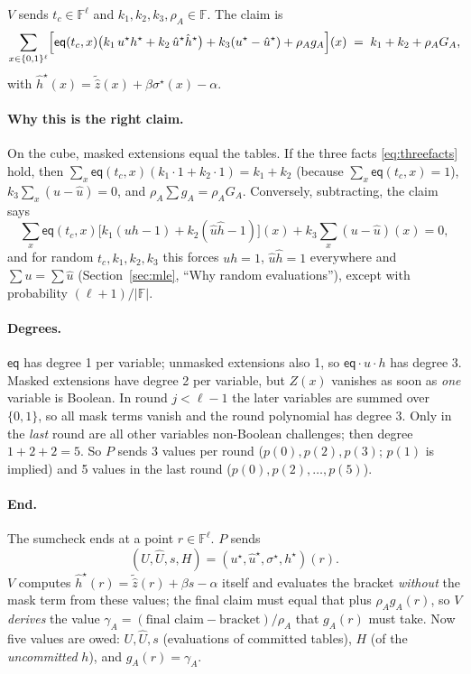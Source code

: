 \documentclass[11pt,a4paper]{article}
\newcommand{\F}{\mathbb{F}}
\newcommand{\cube}[1]{\{0,1\}^{#1}}
\newcommand{\eq}{\mathsf{eq}}
\newcommand{\mle}[1]{\widetilde{#1}}
\newcommand{\msk}[1]{#1^{\star}}
\newcommand{\uh}{\hat{u}}
\newcommand{\hh}{\hat{h}}
\newcommand{\zh}{\hat{z}}
\theoremstyle{definition}
\theoremstyle{plain}
\begin{document}
$V$ sends $t_c\in\F^\ell$ and $k_1,k_2,k_3,\rho_A\in\F$. The claim is
\[
  \sum_{x\in\cube{\ell}}\Bigl[\eq(t_c,x)\bigl(k_1\,\msk u\msk h+k_2\,\msk\uh\msk\hh\bigr)+k_3(\msk u-\msk\uh)+\rho_Ag_A\Bigr](x)
  \;=\;k_1+k_2+\rho_AG_A,
\]
with $\msk\hh(x)=\mle{\zh}(x)+\beta\msk\sigma(x)-\alpha$.

\paragraph{Why this is the right claim.} On the cube, masked extensions equal the tables. If the three
facts \eqref{eq:threefacts} hold, then $\sum_x\eq(t_c,x)(k_1\cdot 1+k_2\cdot 1)=k_1+k_2$ (because
$\sum_x\eq(t_c,x)=1$), $k_3\sum_x(u-\uh)=0$, and $\rho_A\sum g_A=\rho_AG_A$. Conversely, subtracting,
the claim says
\[
  \sum_x\eq(t_c,x)\bigl[k_1(uh-1)+k_2(\uh\hh-1)\bigr](x)+k_3\textstyle\sum_x(u-\uh)(x)=0 ,
\]
and for random $t_c,k_1,k_2,k_3$ this forces $uh=1$, $\uh\hh=1$ everywhere and $\sum u=\sum\uh$
(Section~\ref{sec:mle}, ``Why random evaluations''), except with probability $(\ell+1)/|\F|$.

\paragraph{Degrees.} $\eq$ has degree 1 per variable; unmasked extensions also 1, so
$\eq\cdot u\cdot h$ has degree 3. Masked extensions have degree 2 per variable, but $Z(x)$ vanishes as
soon as \emph{one} variable is Boolean. In round $j<\ell-1$ the later variables are summed over $\{0,1\}$,
so all mask terms vanish and the round polynomial has degree 3. Only in the \emph{last} round are all other
variables non-Boolean challenges; then degree $1+2+2=5$. So $P$ sends 3 values per round
($p(0),p(2),p(3)$; $p(1)$ is implied) and 5 values in the last round ($p(0),p(2),\dots,p(5)$).

\paragraph{End.} The sumcheck ends at a point $r\in\F^\ell$. $P$ sends
\[
  (U,\hat U,s,H)=(\msk u,\msk\uh,\msk\sigma,\msk h)(r).
\]
$V$ computes $\msk\hh(r)=\mle\zh(r)+\beta s-\alpha$ itself and evaluates the bracket \emph{without} the
mask term from these values; the final claim must equal that plus $\rho_Ag_A(r)$, so $V$ \emph{derives}
the value $\gamma_A=(\text{final claim}-\text{bracket})/\rho_A$ that $g_A(r)$ must take. Now five values are
owed: $U,\hat U,s$ (evaluations of committed tables), $H$ (of the \emph{uncommitted} $h$), and $g_A(r)=\gamma_A$.
\end{document}
